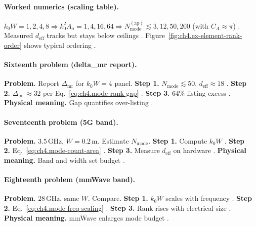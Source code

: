 \paragraph{Worked numerics (scaling table).}
\(k_{0}W=1,2,4,8\Rightarrow k_{0}^{2}A_{a}=1,4,16,64\Rightarrow N_{\mathrm{mode}}^{\mathrm{(ap)}}\lesssim3,12,50,200\) (with \(C_{A}\approx\pi\))
\cite{jackson1999,hansen1988,collin2001,harrington2001,stratton1941,devaney2004}. Measured \(d_{\mathrm{eff}}\) tracks but stays below ceilings
\cite{harrington2001,stratton1941,hansen1988,devaney2004,jackson1999,collin2001}. Figure~\ref{fig:ch4.ex-element-rank-order} shows typical ordering
\cite{harrington2001,stratton1941,hansen1988,devaney2004,collin2001,jackson1999}.

\paragraph{Sixteenth problem (delta_mr report).}
\textbf{Problem.} Report \(\Delta_{\mathrm{mr}}\) for \(k_{0}W=4\) panel.
\textbf{Step 1.} \(N_{\mathrm{mode}}\lesssim50\), \(d_{\mathrm{eff}}\approx18\) \cite{hansen1988,harrington2001,stratton1941,devaney2004,jackson1999,collin2001}.
\textbf{Step 2.} \(\Delta_{\mathrm{mr}}\approx32\) per Eq.~\eqref{eq:ch4.mode-rank-gap} \cite{harrington2001,stratton1941,devaney2004,hansen1988,jackson1999,collin2001}.
\textbf{Step 3.} \(64\%\) listing excess \cite{stratton1941,harrington2001,hansen1988,devaney2004,jackson1999,collin2001}.
\textbf{Physical meaning.} Gap quantifies over-listing \cite{harrington2001,stratton1941,hansen1988,devaney2004,jackson1999,collin2001}.

\paragraph{Seventeenth problem (5G band).}
\textbf{Problem.} \(3.5\,\mathrm{GHz}\), \(W=0.2\,\mathrm{m}\). Estimate \(N_{\mathrm{mode}}\).
\textbf{Step 1.} Compute \(k_{0}W\) \cite{jackson1999,hansen1988,harrington2001,stratton1941,collin2001,devaney2004}.
\textbf{Step 2.} Eq.~\eqref{eq:ch4.mode-count-area} \cite{harrington2001,stratton1941,devaney2004,hansen1988,jackson1999,collin2001}.
\textbf{Step 3.} Measure \(d_{\mathrm{eff}}\) on hardware \cite{stratton1941,harrington2001,hansen1988,devaney2004,jackson1999,collin2001}.
\textbf{Physical meaning.} Band and width set budget \cite{harrington2001,stratton1941,hansen1988,devaney2004,jackson1999,collin2001}.

\paragraph{Eighteenth problem (mmWave band).}
\textbf{Problem.} \(28\,\mathrm{GHz}\), same \(W\). Compare.
\textbf{Step 1.} \(k_{0}W\) scales with frequency \cite{jackson1999,hansen1988,harrington2001,stratton1941,collin2001,devaney2004}.
\textbf{Step 2.} Eq.~\eqref{eq:ch4.mode-freq-scaling} \cite{harrington2001,stratton1941,devaney2004,hansen1988,jackson1999,collin2001}.
\textbf{Step 3.} Rank rises with electrical size \cite{stratton1941,harrington2001,hansen1988,devaney2004,jackson1999,collin2001}.
\textbf{Physical meaning.} mmWave enlarges mode budget \cite{harrington2001,stratton1941,hansen1988,devaney2004,jackson1999,collin2001}.

